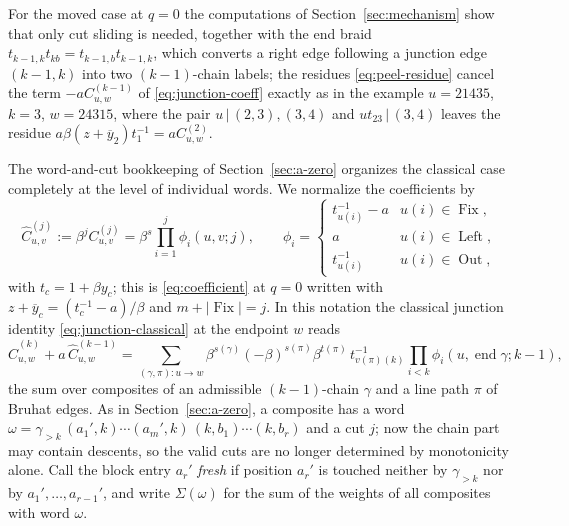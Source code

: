 \documentclass[11pt]{article}
\newcommand{\Fix}{\operatorname{Fix}}
\newcommand{\Left}{\operatorname{Left}}
\newcommand{\Out}{\operatorname{Out}}
\begin{document}
For the moved case at $q=0$ the computations of
Section~\ref{sec:mechanism} show that only cut sliding is needed,
together with the end braid $t_{k-1,k}t_{kb}=t_{k-1,b}t_{k-1,k}$,
which converts a right edge following a junction edge $(k-1,k)$ into
two $(k-1)$-chain labels; the residues \eqref{eq:peel-residue} cancel
the term $-aC^{(k-1)}_{u,w}$ of \eqref{eq:junction-coeff} exactly as
in the example $u=21435$, $k=3$, $w=24315$, where the pair
$u\,\big|\,(2,3),(3,4)$ and $ut_{23}\,\big|\,(3,4)$ leaves the residue
$a\beta(z+\overline y_2)t_1^{-1}=aC^{(2)}_{u,w}$.

The word-and-cut bookkeeping of Section~\ref{sec:a-zero} organizes
the classical case completely at the level of individual words. We
normalize the coefficients by
\[
 \widehat C^{(j)}_{u,v}:=\beta^{j}C^{(j)}_{u,v}
 =\beta^{s}\prod_{i=1}^{j}\phi_i(u,v;j),
 \qquad
 \phi_i=\begin{cases}
  t_{u(i)}^{-1}-a& u(i)\in\Fix,\\
  a& u(i)\in\Left,\\
  t_{u(i)}^{-1}& u(i)\in\Out,
 \end{cases}
\]
with $t_c=1+\beta y_c$; this is \eqref{eq:coefficient} at $q=0$ written
with $z+\overline y_c=(t_c^{-1}-a)/\beta$ and $m+|\Fix|=j$. In this
notation the classical junction identity \eqref{eq:junction-classical}
at the endpoint $w$ reads
\begin{equation}\label{eq:classical-junction-hat}
 \widehat C^{(k)}_{u,w}+a\,\widehat C^{(k-1)}_{u,w}
 =\sum_{(\gamma,\pi)\colon u\to w}
   \beta^{s(\gamma)}(-\beta)^{s(\pi)}\beta^{t(\pi)}\,
   t_{v(\pi)(k)}^{-1}\prod_{i<k}\phi_i(u,\operatorname{end}\gamma;k-1),
\end{equation}
the sum over composites of an admissible $(k-1)$-chain $\gamma$ and a
line path $\pi$ of Bruhat edges. As in Section~\ref{sec:a-zero}, a
composite has a word
$\omega=\gamma_{>k}\,(a_1',k)\cdots(a_m',k)\,(k,b_1)\cdots(k,b_r)$ and a
cut $j$; now the chain part may contain descents, so the valid cuts
are no longer determined by monotonicity alone. Call the block entry
$a_r'$ \emph{fresh} if position $a_r'$ is touched neither by
$\gamma_{>k}$ nor by $a_1',\ldots,a_{r-1}'$, and write
$\Sigma(\omega)$ for the sum of the weights of all composites with
word $\omega$.
\end{document}
